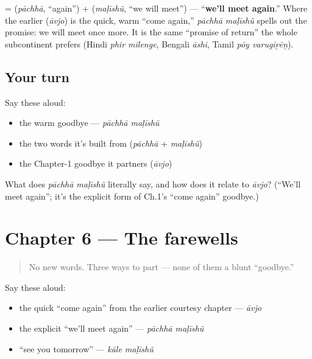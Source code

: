 \begin{cousinweb}
\textbf{ } = \textbf{} (\emph{pāchhā}, \textquotedblleft{}again\textquotedblright{}) + \textbf{} (\emph{maḷīshũ}, \textquotedblleft{}we will meet\textquotedblright{}) — \textquotedblleft{}\textbf{we'll meet again}.\textquotedblright{} Where the earlier \textbf{} (\emph{āvjo}) is the quick, warm \textquotedblleft{}come again,\textquotedblright{} \emph{pāchhā maḷīshũ} spells out the promise: we will meet once more. It is the same \textquotedblleft{}promise of return\textquotedblright{} the whole subcontinent prefers (Hindi \emph{phir milenge}, Bengali \emph{āshi}, Tamil \emph{pōy varugiṟēṉ}).
\end{cousinweb}

\subsection*{Your turn}
Say these aloud:

\begin{itemize}
\raggedright
  \item the warm goodbye — \emph{pāchhā maḷīshũ}
  \item the two words it's built from (\emph{pāchhā} + \emph{maḷīshũ})
  \item the Chapter-1 goodbye it partners (\emph{āvjo})
\end{itemize}

\begin{tcolorbox}[breakable,colback=teal!4,colframe=teal!35!black,title={Before you move on}]
What does \emph{pāchhā maḷīshũ} literally say, and how does it relate to \emph{āvjo}? (\textquotedblleft{}We'll meet again\textquotedblright{}; it's the explicit form of Ch.1's \textquotedblleft{}come again\textquotedblright{} goodbye.)
\end{tcolorbox}
\section[Practice]{Chapter 6 — The farewells}

\label{lesson:GU-C04-practice}



\begin{quote}
No new words. Three ways to part — none of them a blunt \textquotedblleft{}goodbye.\textquotedblright{}
\end{quote}

\begin{culture}
Say these aloud:

\begin{itemize}
\raggedright
  \item the quick \textquotedblleft{}come again\textquotedblright{} from the earlier courtesy chapter — \emph{āvjo}
  \item the explicit \textquotedblleft{}we'll meet again\textquotedblright{} — \emph{pāchhā maḷīshũ}
  \item \textquotedblleft{}see you tomorrow\textquotedblright{} — \emph{kāle maḷīshũ}
\end{itemize}
\end{culture}

